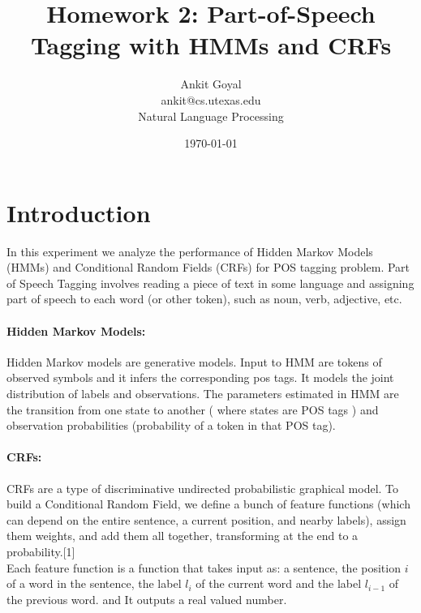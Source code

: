 \documentclass[10pt] {article}
\author{Ankit Goyal \\ankit@cs.utexas.edu \\ Natural Language Processing}
\title{Homework 2: Part-of-Speech Tagging with HMMs and CRFs}
\date{\today}
\begin{document}
\maketitle


\section{Introduction}
In this experiment we analyze the performance of Hidden Markov Models (HMMs) and Conditional Random Fields (CRFs) for POS tagging problem. Part of Speech Tagging involves reading a piece of text in some language and assigning part of speech to each word (or other token), such as noun, verb, adjective, etc. 

\paragraph{Hidden Markov Models: } Hidden Markov models are generative models. Input to HMM are tokens of observed symbols and it infers the corresponding pos tags. It models the joint distribution of labels and observations. The parameters estimated in HMM are the transition from one state to another ( where states are POS tags ) and observation probabilities (probability of a token in that POS tag).

\paragraph{CRFs:} CRFs are a type of discriminative undirected probabilistic graphical model. To build a Conditional Random Field, we define a bunch of feature functions (which can depend on the entire sentence, a current position, and nearby labels), assign them weights, and add them all together, transforming at the end to a probability.[1] \\

\noindent Each feature function is a function that takes input as: a sentence, the position $i$ of a word in the sentence, the label $l_{i}$ of the current word and the label $l_{i-1}$ of the previous word. and It outputs a real valued number.
\end{document}
